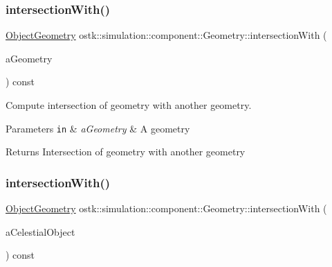 \subsubsection{\texorpdfstring{intersection\+With()}{intersectionWith()}\hspace{0.1cm}{\footnotesize\ttfamily [1/2]}}
{\footnotesize\ttfamily \hyperlink{namespaceostk_1_1simulation_1_1component_a911837ab7e6f8471e9927a74795a0077}{Object\+Geometry} ostk\+::simulation\+::component\+::\+Geometry\+::intersection\+With (\begin{DoxyParamCaption}\item[{const \hyperlink{namespaceostk_1_1simulation_1_1component_a911837ab7e6f8471e9927a74795a0077}{Object\+Geometry} \&}]{a\+Geometry }\end{DoxyParamCaption}) const}



Compute intersection of geometry with another geometry. 


\begin{DoxyParams}[1]{Parameters}
\mbox{\tt in}  & {\em a\+Geometry} & A geometry \\
\hline
\end{DoxyParams}
\begin{DoxyReturn}{Returns}
Intersection of geometry with another geometry 
\end{DoxyReturn}
\mbox{\label{classostk_1_1simulation_1_1component_1_1_geometry_ab36a969d150208ea070d214eff3d52d7}} 
\subsubsection{\texorpdfstring{intersection\+With()}{intersectionWith()}\hspace{0.1cm}{\footnotesize\ttfamily [2/2]}}
{\footnotesize\ttfamily \hyperlink{namespaceostk_1_1simulation_1_1component_a911837ab7e6f8471e9927a74795a0077}{Object\+Geometry} ostk\+::simulation\+::component\+::\+Geometry\+::intersection\+With (\begin{DoxyParamCaption}\item[{const Celestial \&}]{a\+Celestial\+Object }\end{DoxyParamCaption}) const}




